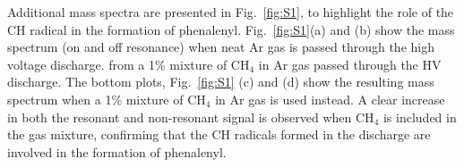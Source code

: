 \documentclass[journal=jacsat,manuscript=suppinfo]{achemso}
\begin{document}
Additional mass spectra are presented in Fig.~\ref{fig:S1}, to highlight the role of the CH radical in the formation of phenalenyl. Fig.~\ref{fig:S1}(a) and (b) show the mass spectrum (on and off resonance) when neat Ar gas is passed through the high voltage discharge. from a 1\% mixture of CH$_4$ in Ar gas passed through the HV discharge. The bottom plots, Fig.~\ref{fig:S1} (c) and (d) show the resulting mass spectrum when a 1\% mixture of CH$_4$ in Ar gas is used instead. A clear increase in both the resonant and non-resonant signal is observed when CH$_4$ is included in the gas mixture, confirming that the CH radicals formed in the discharge are involved in the formation of phenalenyl.



%
\end{document}
